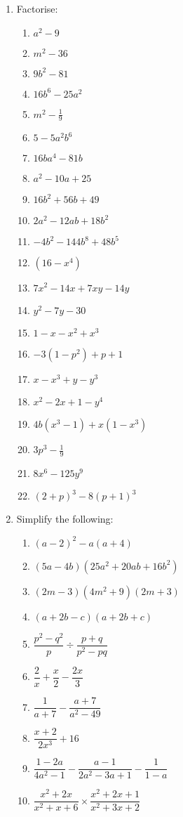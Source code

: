 \begin{eocexercises}{}
\begin{enumerate}[itemsep=5pt, label=\textbf{\arabic*}. ]
\item Factorise:
\begin{multicols}{2}
\begin{enumerate}[itemsep=5pt, label=\textbf{(\alph*)} ] 
\item ${a}^{2}-9$
\item ${m}^{2}-36$
\item $9{b}^{2}-81$
\item $16{b}^{6}-25{a}^{2}$
\item ${m}^{2}-\frac{1}{9}$
\item $5-5{a}^{2}{b}^{6}$
\item $16b{a}^{4}-81b$
\item ${a}^{2}-10a+25$
\item $16{b}^{2}+56b+49$
\item $2{a}^{2}-12ab+18{b}^{2}$
\item $-4{b}^{2}-144{b}^{8}+48{b}^{5}$
\item $(16-{x}^{4})$
\item ${7x}^{2}-14x+7xy-14y$
\item ${y}^{2}-7y-30$
\item $1-x-{x}^{2}+{x}^{3}$
\item $-3(1-{p}^{2})+p+1$
\item $x-x^{3} + y - y^{3}$
\item $x^{2} - 2x + 1 - y^{4}$
\item $4b(x^{3} - 1) + x(1-x^{3})$
\item $3p^{3} - \frac{1}{9}$
\item $8x^6-125y^9$
\item $(2+p)^3- 8(p+1)^3$
\end{enumerate}
\end{multicols}


\item Simplify the following:
\begin{multicols}{2}
\begin{enumerate}[itemsep=5pt, label=\textbf{(\alph*)} ] 

\item ${(a-2)}^{2}-a(a+4)$
\item $(5a-4b)(25{a}^{2}+20ab+16{b}^{2})$
\item $(2m-3)(4{m}^{2}+9)(2m+3)$
\item $(a+2b-c)(a+2b+c)$
\item $\dfrac{{p}^{2}-{q}^{2}}{p}÷\dfrac{p+q}{{p}^{2}-pq}$
\item $\dfrac{2}{x}+\dfrac{x}{2}-\dfrac{2x}{3}$
\item $\dfrac{1}{a+7}-\dfrac{a+7}{a^{2}-49}$
\item $\dfrac{x+2}{2x^{3}} + 16$
\item $\dfrac{1-2a}{4a^{2} -1} - \dfrac{a-1}{2a^{2}-3a+1} - \dfrac{1}{1-a}$
\item $\dfrac{x^{2} + 2x}{x^{2}+ x + 6} \times \dfrac{x^{2} + 2x + 1}{x^{2} + 3x +2}$


\end{enumerate}
\end{multicols}
\end{enumerate}
\end{eocexercises}
